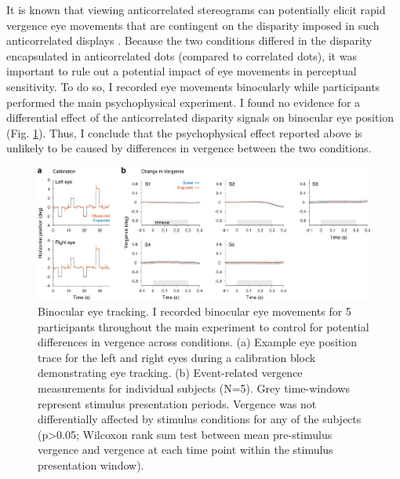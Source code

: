 It is known that viewing anticorrelated stereograms can potentially elicit rapid vergence eye movements that are contingent on the disparity imposed in such anticorrelated displays \cite{Masson:1997jq}. Because the two conditions differed in the disparity encapsulated in anticorrelated dots (compared to correlated dots), it was important to rule out a potential impact of eye movements in perceptual sensitivity. To do so, I recorded eye movements binocularly while participants performed the main psychophysical experiment. I found no evidence for a differential effect of the anticorrelated disparity signals on binocular eye position (Fig. \ref{fig:c2fs1}). Thus, I conclude that the psychophysical effect reported above is unlikely to be caused by differences in vergence between the two conditions.

\begin{figure}
  \centering
  \includegraphics[width=14cm,keepaspectratio]{FigS1}
  \caption[Binocular eye tracking.]{Binocular eye tracking. I recorded binocular eye movements for 5 participants throughout the main experiment to control for potential differences in vergence across conditions. (a) Example eye position trace for the left and right eyes during a calibration block demonstrating eye tracking. (b) Event-related vergence measurements for individual subjects (N=5). Grey time-windows represent stimulus presentation periods. Vergence was not differentially affected by stimulus conditions for any of the subjects (p>0.05; Wilcoxon rank sum test between mean pre-stimulus vergence and vergence at each time point within the stimulus presentation window).}
  \label{fig:c2fs1}
\end{figure}



